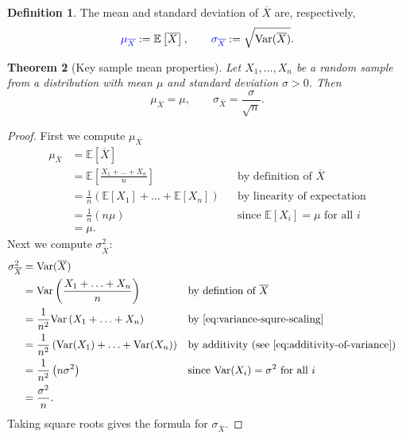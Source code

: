 \documentclass[10pt]{article}
\newtheorem{theorem}{Theorem}
\theoremstyle{definition}
\newtheorem{definition}[theorem]{Definition}
\newcommand{\1}[1]{\textbf{1}_{\left[#1\right]}} %
\def\E{\mathbb{E}} %
\def\Var{\mathrm{Var}} %
\DeclareRobustCommand{\demph}[1]{%
  \ifmmode
  {\color{Blue}#1}%
  \else
  {\color{Blue}\bfseries\slshape #1}%
  \fi
}
\begin{document}
\begin{definition}
  The mean and standard deviation of $\overline{X}$ are,
  respectively,
  \begin{equation*}
    \demph{\mu_{\overline{X}}}:=\E\left[\overline{X} \right],
    \qquad \demph{\sigma_{\overline{X}}}:=\sqrt{\Var(\overline{X})}.
  \end{equation*}
\end{definition}
\begin{theorem}[Key sample mean properties]
  \label{thm:sample-mean-mean-and-sd}
  Let $X_{1},\ldots,X_{n}$ be a random sample from a distribution with mean
  $\mu$ and standard deviation $\sigma>0$. Then
  \begin{equation*}
    {\mu_{\overline{X}}}= \mu,
    \qquad {\sigma_{\overline{X}}}=\frac{\sigma}{\sqrt{n}}.
  \end{equation*}
\end{theorem}
\begin{proof}
  First we compute $\mu_{\overline{X}}$
  \begin{align*}
    \mu_{\overline{X}}
    &= \E\left[\overline{X} \right] \\
    &= \E\left[\frac{X_{1}+\ldots+X_{n}}{n} \right] &&\text{by definition of $\overline{X}$}\\
    &= \frac{1}{n}\left( \E\left[X_{1} \right]+\ldots+ \E\left[X_{n} \right] \right)  &&\text{by linearity of expectation}\\
    &= \frac{1}{n}\left( n\mu \right) &&\text{since $\E\left[X_{i} \right]=\mu$ for all $i$}\\
    &= \mu.
  \end{align*}
  Next we compute $\sigma^{2}_{\overline{X}}$:
  \begin{align*}
    \sigma^{2}_{\overline{X}}
    &= \Var(\overline{X})\\
    &= \Var \left( \frac{X_{1}+\ldots+X_{n}}{n} \right) &&\text{by defintion of $\overline{X}$}\\
    &= \frac{1}{n^{2}}\Var \left( X_{1}+\ldots+X_{n} \right) &&\text{by \cref{eq:variance-squre-scaling}}\\
    &= \frac{1}{n^{2}}\left( \Var(X_{1})+\ldots+\Var(X_{n}) \right) &&\text{by additivity (see \cref{eq:additivity-of-variance})}\\
    &= \frac{1}{n^{2}} \left( n\sigma^{2} \right) &&\text{since $\Var(X_{i})=\sigma^{2}$ for all $i$}\\
    &= \frac{\sigma^{2}}{n}.
  \end{align*}
  Taking square roots gives the formula for $\sigma_{\overline{X}}$.
\end{proof}
\end{document}
